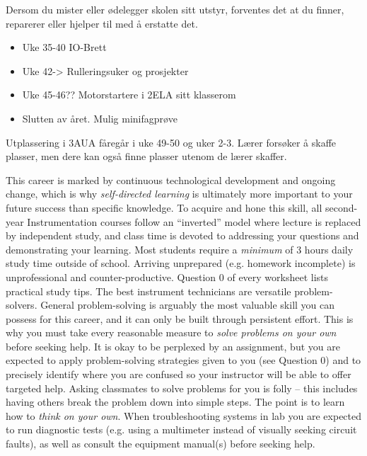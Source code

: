 %

\noindent
{} Dersom du mister eller ødelegger skolen sitt utstyr, forventes det at du finner, reparerer eller hjelper til med å erstatte det. 
\vskip 10pt
\vfil
\noindent
{} 
\begin{itemize}
	\item Uke 35-40 IO-Brett
	\item Uke 42-> Rulleringsuker og prosjekter
	\item Uke 45-46?? Motorstartere i 2ELA sitt klasserom
	\item Slutten av året. Mulig minifagprøve
\end{itemize}
\vskip 10pt
\vfil
\noindent
{} Utplassering i 3AUA fåregår i uke 49-50 og uker 2-3. Lærer forsøker å skaffe plasser, men dere kan også finne plasser utenom de lærer skaffer. 
\vskip 10pt
\vfil


\noindent
{} This career is marked by continuous technological development and ongoing change, which is why {\it self-directed learning} is ultimately more important to your future success than specific knowledge.  To acquire and hone this skill, all second-year Instrumentation courses follow an ``inverted'' model where lecture is replaced by independent study, and class time is devoted to addressing your questions and demonstrating your learning.  Most students require a {\it minimum} of 3 hours daily study time outside of school.  Arriving unprepared (e.g. homework incomplete) is unprofessional and counter-productive.  Question 0 of every worksheet lists practical study tips.
\vskip 10pt
\noindent
{} The best instrument technicians are versatile problem-solvers.  General problem-solving is arguably the most valuable skill you can possess for this career, and it can only be built through persistent effort.  This is why you must take every reasonable measure to {\it solve problems on your own} before seeking help.  It is okay to be perplexed by an assignment, but you are expected to apply problem-solving strategies given to you (see Question 0) and to precisely identify where you are confused so your instructor will be able to offer targeted help.  Asking classmates to solve problems for you is folly -- this includes having others break the problem down into simple steps.  The point is to learn how to {\it think on your own}.  When troubleshooting systems in lab you are expected to run diagnostic tests (e.g. using a multimeter instead of visually seeking circuit faults), as well as consult the equipment manual(s) before seeking help.  
\vskip 10pt
\eject

